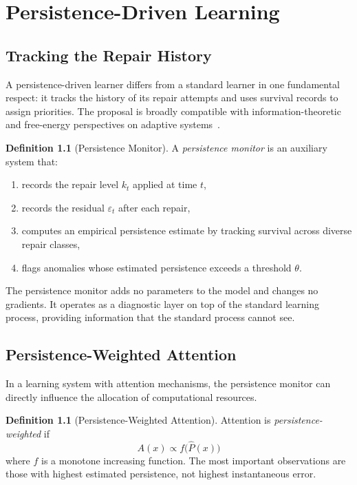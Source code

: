 \documentclass[12pt,oneside]{book}
\theoremstyle{plain}
\theoremstyle{definition}
\newtheorem{definition}[theorem]{Definition}
\theoremstyle{remark}
\newcommand{\eps}{\varepsilon}
\newcommand{\1}{\mathbf{1}}
\begin{document}
\chapter{Persistence-Driven Learning}

\section{Tracking the Repair History}

A persistence-driven learner differs from a standard learner in one fundamental respect: it tracks the history of its repair attempts and uses survival records to assign priorities. The proposal is broadly compatible with information-theoretic and free-energy perspectives on adaptive systems~\cite{friston2010,amari2016}.

\begin{definition}[Persistence Monitor]
A \emph{persistence monitor} is an auxiliary system that:
\begin{enumerate}[label=(\roman*)]
\item records the repair level $k_t$ applied at time $t$,
\item records the residual $\eps_t$ after each repair,
\item computes an empirical persistence estimate by tracking survival across diverse repair classes,
\item flags anomalies whose estimated persistence exceeds a threshold $\theta$.
\end{enumerate}
\end{definition}

The persistence monitor adds no parameters to the model and changes no gradients. It operates as a diagnostic layer on top of the standard learning process, providing information that the standard process cannot see.

\section{Persistence-Weighted Attention}

In a learning system with attention mechanisms, the persistence monitor can directly influence the allocation of computational resources.

\begin{definition}[Persistence-Weighted Attention]
Attention is \emph{persistence-weighted} if
\[
A(x) \propto f\!\bigl(\hat{P}(x)\bigr)
\]
where $f$ is a monotone increasing function. The most important observations are those with highest estimated persistence, not highest instantaneous error.
\end{definition}
\end{document}
